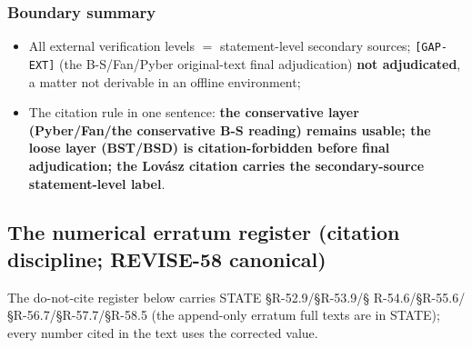 \subsubsection{Boundary summary}\label{subsec:add-litsum}

\begin{itemize}
\item All external verification levels $=$ statement-level secondary
sources; \texttt{[GAP-EXT]} (the B-S/Fan/Pyber original-text final
adjudication) \textbf{not adjudicated}, a matter not derivable in an
offline environment;
\item The citation rule in one sentence: \textbf{the conservative layer
(Pyber/Fan/the conservative B-S reading) remains usable; the loose layer
(BST/BSD) is citation-forbidden before final adjudication; the Lov\'{a}sz
citation carries the secondary-source statement-level label}.
\end{itemize}

\subsection{The numerical erratum register (citation discipline;
REVISE-58 canonical)}\label{subsec:add-errata}

The do-not-cite register below carries STATE \S R-52.9/\S R-53.9/\S
R-54.6/\S R-55.6/\S R-56.7/\S R-57.7/\S R-58.5 (the append-only erratum
full texts are in STATE); every number cited in the text uses the corrected
value.

